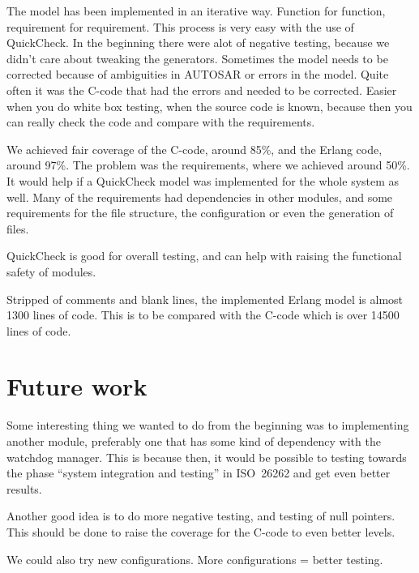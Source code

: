 
The model has been implemented in an iterative way. Function for function,
requirement for requirement. This process is very easy with the use of
QuickCheck.
In the beginning there were alot of negative testing, because we didn't care
about tweaking the generators.
Sometimes the model needs to be corrected because of ambiguities in AUTOSAR or
errors in the model. Quite often it was the C-code that had the errors and
needed to be corrected.
Easier when you do white box testing, when the source code is known,
because then you can really check the code and compare with the requirements.

We achieved fair coverage of the C-code, around 85\%, and the Erlang code,
around 97\%. The problem was the requirements, where we achieved around 50\%. It
would help if a QuickCheck model was implemented for the whole system as
well. Many of the requirements had dependencies in other modules, and some
requirements for the file structure, the configuration or even the generation of
files.

QuickCheck is good for overall testing, and can help with raising the functional
safety of modules.


Stripped of comments and blank lines, the implemented Erlang model is
almost 1300 lines of code. This is to be compared with the C-code
which is over 14500 lines of code.


\section{Future work}
Some interesting thing we wanted to do from the beginning was to implementing
another module, preferably one that has some kind of dependency with the
watchdog manager. This is because then, it would be possible to testing towards
the phase ``system integration and testing'' in ISO~26262 and get even better
results.

Another good idea is to do more negative testing, and testing of null
pointers. This should be done to raise the coverage for the C-code to even
better levels.

We could also try new configurations. More configurations = better testing.